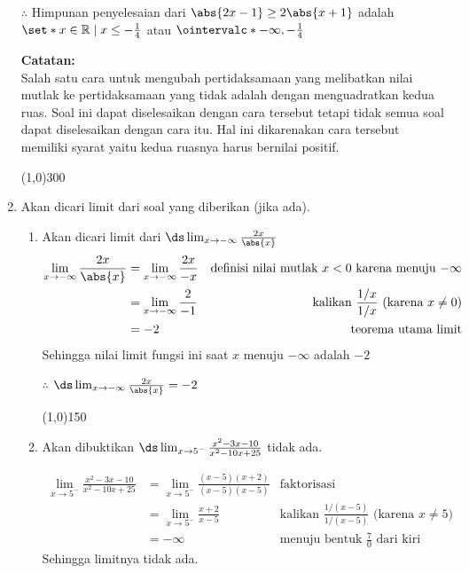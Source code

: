 \begin{enumerate}[leftmargin=*, label={\arabic*}.]
$\therefore$ Himpunan penyelesaian dari $\abs{2x-1} \geq 2\abs{x+1}$
adalah $\set*{x \in \mathbb{R} \mid x \leq -\frac{1}{4}}$
atau $\ointervalc*{-\infty,-\frac{1}{4}}$

\vspace{0.1cm}
\textbf{Catatan:}\\
Salah satu cara untuk mengubah pertidaksamaan yang melibatkan nilai mutlak ke 
pertidaksamaan yang tidak adalah dengan menguadratkan kedua ruas. Soal ini 
dapat diselesaikan dengan cara tersebut tetapi tidak semua soal dapat 
diselesaikan dengan cara itu. Hal ini dikarenakan cara tersebut memiliki syarat 
yaitu kedua ruasnya harus bernilai positif.
\begin{center}
    \line(1,0){300}
\end{center}
\item Akan dicari limit dari soal yang diberikan (jika ada).
\begin{enumerate}[label={\alph*}.]
    \item Akan dicari limit dari 
    $\ds \lim_{x\to -\infty} \frac{2x}{\abs{x}}$
    \begin{align*}
        \lim_{x\to -\infty} \frac{2x}{\abs{x}} 
        &= \lim_{x\to -\infty} \frac{2x}{-x}
        &\text{definisi nilai mutlak $x < 0$ karena menuju $-\infty$}\\
        &= \lim_{x\to -\infty} \frac{2}{-1}
        &\text{kalikan $\frac{1/x}{1/x}$ (karena $x \neq 0$)}\\
        &= -2
        &\text{teorema utama limit}
    \end{align*}
    Sehingga nilai limit fungsi ini saat $x$ menuju $-\infty$ adalah $-2$

    $\therefore$ $\ds \lim_{x\to -\infty} \frac{2x}{\abs{x}} = -2$
\begin{center}
    \line(1,0){150}
\end{center}
    \item Akan dibuktikan 
    $\ds \lim_{x\to 5^{-}} \frac{x^{2}-3x-10}{x^{2}-10x+25}$ tidak ada.

    \begin{align*}
        \lim_{x\to 5^{-}} \frac{x^{2}-3x-10}{x^{2}-10x+25} 
        &= \lim_{x\to 5^{-}} \frac{(x-5)(x+2)}{(x-5)(x-5)}
        &\text{faktorisasi}\\
        &= \lim_{x\to 5^{-}} \frac{x+2}{x-5}
        &\text{kalikan $\frac{1/(x-5)}{1/(x-5)}$ (karena $x \neq 5$)}\\
        &= -\infty
        &\text{menuju bentuk $\frac{7}{0}$ dari kiri}
    \end{align*}
    Sehingga limitnya tidak ada.


\end{enumerate}
\end{enumerate}

